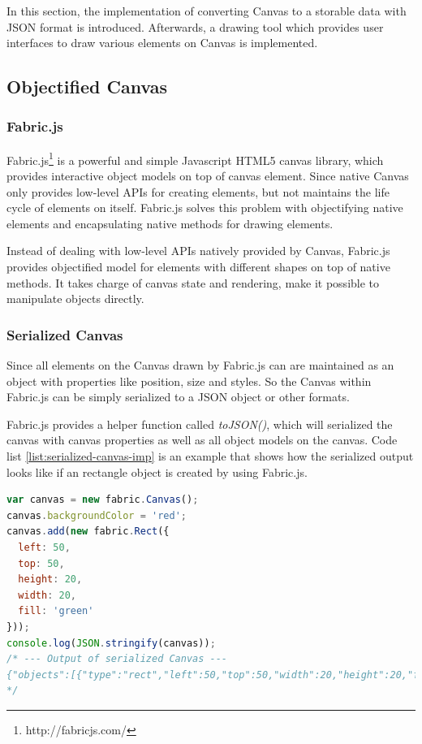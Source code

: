 In this section, the implementation of converting Canvas to a storable data with JSON format is introduced. Afterwards, a drawing tool which provides user interfaces to draw various elements on Canvas is implemented.

\subsection{Objectified Canvas}

\subsubsection{Fabric.js}
Fabric.js\footnote{http://fabricjs.com/} is a powerful and simple Javascript HTML5 canvas library, which provides interactive object models on top of canvas element. Since native Canvas only provides low-level APIs for creating elements, but not maintains the life cycle of elements on itself. Fabric.js solves this problem with objectifying native elements and encapsulating native methods for drawing elements. 

Instead of dealing with low-level APIs natively provided by Canvas, Fabric.js provides objectified model for elements with different shapes  on top of native methods. It takes charge of canvas state and rendering, make it possible to manipulate objects directly.


\subsubsection{Serialized Canvas}
Since all elements on the Canvas drawn by Fabric.js can are maintained as an object with properties like position, size and styles.
So the Canvas within Fabric.js can be simply serialized to a JSON object or other formats. 

Fabric.js provides a helper function called \textit{toJSON()}, which will serialized the canvas with canvas properties as well as all object models on the canvas. Code list \ref{list:serialized-canvas-imp} is an example that shows how the serialized output looks like if an rectangle object is created by using Fabric.js.

\begin{lstlisting}[language=JavaScript, caption=Serialized Canvas by Fabric.js , label={list:serialized-canvas-imp}]
var canvas = new fabric.Canvas();
canvas.backgroundColor = 'red';
canvas.add(new fabric.Rect({
  left: 50,
  top: 50,
  height: 20,
  width: 20,
  fill: 'green'
}));
console.log(JSON.stringify(canvas));
/* --- Output of serialized Canvas --- 
{"objects":[{"type":"rect","left":50,"top":50,"width":20,"height":20,"fill":"green","overlayFill":null,"stroke":null,"strokeWidth":1,"strokeDashArray":null,"scaleX":1,"scaleY":1,"angle":0,"flipX":false,"flipY":false,"opacity":1,"selectable":true,"hasControls":true,"hasBorders":true,"hasRotatingPoint":false,"transparentCorners":true,"perPixelTargetFind":false,"rx":0,"ry":0}],"background":"rgba(0, 0, 0, 0)"}
*/
\end{lstlisting}

